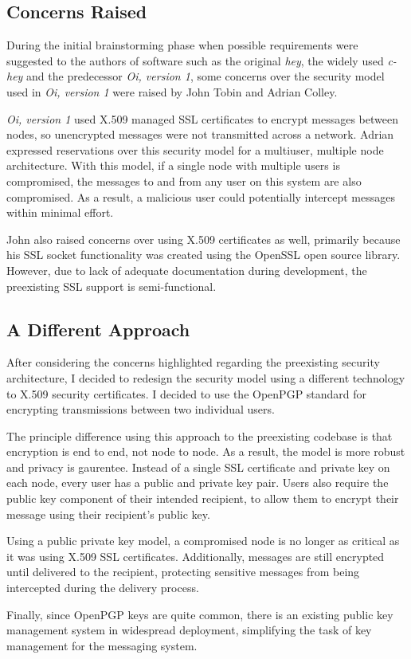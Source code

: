 
\subsection{Concerns Raised}

During the initial brainstorming phase when possible requirements were
suggested to the authors of software such as the original \emph{hey},
the widely used \emph{c-hey} and the predecessor \emph{Oi, version 1},
some concerns over the security model used in \emph{Oi, version 1} were
raised by John Tobin and Adrian Colley. 


\emph{Oi, version 1} used X.509 managed SSL certificates to encrypt 
messages between nodes, so unencrypted messages were not transmitted 
across a network. Adrian expressed reservations over this security model 
for a multiuser, multiple node architecture. With this model, if a
single node with multiple users is compromised, the messages to and from
any user on this system are also compromised. As a result, a malicious
user could potentially intercept messages within minimal effort.


John also raised concerns over using X.509 certificates as well,
primarily because his SSL socket functionality was created using the
OpenSSL open source library. However, due to lack of adequate
documentation during development, the preexisting SSL support is
semi-functional.

\subsection{A Different Approach}

After considering the concerns highlighted regarding the preexisting
security architecture, I decided to redesign the security model using a
different technology to X.509 security certificates. I decided to use the 
OpenPGP standard for encrypting transmissions between two individual 
users.


The principle difference using this approach to the preexisting
codebase is that encryption is end to end, not node to node. As a
result, the model is more robust and privacy is gaurentee. Instead of a
single SSL certificate and private key on each node, every user has a
public and private key pair. Users also require the public key component
of their intended recipient, to allow them to encrypt their message using
their recipient's public key.


Using a public private key model, a compromised node is no longer as
critical as it was using X.509 SSL certificates. Additionally, messages
are still encrypted until delivered to the recipient, protecting
sensitive messages from being intercepted during the delivery process.


Finally, since OpenPGP keys are quite common, there is an existing
public key management system in widespread deployment, simplifying the
task of key management for the messaging system.
